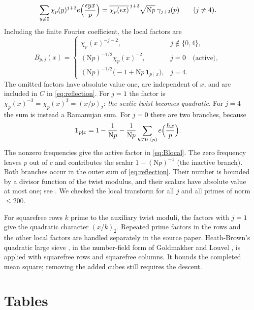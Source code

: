 \documentclass[11pt]{article}
\numberwithin{equation}{section}
\newcommand{\N}{\mathrm N}
\theoremstyle{definition}
\theoremstyle{remark}
\begin{document}
\begin{enumerate}
\begin{equation}
 \sum_{y\not\equiv0}\chi_p(y)^{j+2}e\Bigl(\frac{\epsilon yx}p\Bigr)=\overline{\chi_p(\epsilon x)}^{\,j+2}\sqrt{\N p}\;\gamma_{j+2}(p)
 \qquad(j\ne4).
\end{equation}
Including the finite Fourier coefficient, the local factors are
\begin{equation}\label{eq:Blocal}
 B_{p,j}(x)=\begin{cases}
 \chi_p(x)^{-j-2},&j\notin\{0,4\},\\
 (\N p)^{-1/2}\chi_p(x)^{-2},&j=0\quad\text{(active)},\\
 (\N p)^{-1/2}\bigl(-1+\N p\,\mathbf 1_{p\mid x}\bigr),&j=4.
 \end{cases}
\end{equation}
The omitted factors have absolute value one, are independent of $x$, and are included in $C$ in
\eqref{eq:reflection}. For $j=1$ the factor is $\chi_p(x)^{-3}=\chi_p(x)^3=(x/p)_2$:
\emph{the sextic twist becomes quadratic}. For $j=4$ the sum is instead a Ramanujan sum.
For $j=0$ there are two branches, because
\begin{equation}\label{eq:inactive}
 \mathbf 1_{p\nmid x}=1-\frac1{\N p}
 -\frac1{\N p}\sum_{h\not\equiv0\ (p)}e\Bigl(\frac{hx}p\Bigr).
\end{equation}
The nonzero frequencies give the active factor in \eqref{eq:Blocal}. The zero frequency leaves $p$
out of $c$ and contributes the scalar $1-(\N p)^{-1}$ (the inactive branch). Both branches occur in
the outer sum of \eqref{eq:reflection}. Their number is bounded by a divisor function of the twist
modulus, and their scalars have absolute value at most one; see \cite[\S6.2, App.~A.2]{QRH}.
We checked the local transform for all $j$ and all primes of norm $\le200$.
\end{enumerate}
For squarefree rows $k$ prime to the auxiliary twist moduli, the factors with $j=1$ give the quadratic
character $(x/k)_2$. Repeated prime factors in the rows and the other local factors are handled
separately in the source paper. Heath-Brown's quadratic large sieve \cite{HB95}, in the number-field
form of Goldmakher and Louvel \cite{GL}, is applied with squarefree rows and squarefree columns.
It bounds the completed mean square; removing the added cubes still requires the descent.

\clearpage
\section{Tables}\label{sec:tables}
\end{document}
